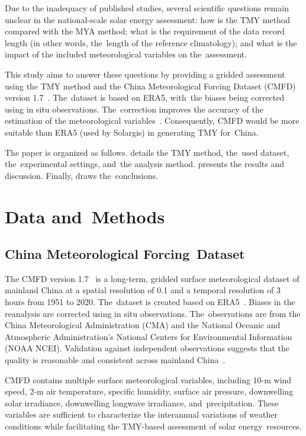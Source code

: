 \documentclass[atmosphere,article,accept,pdftex,moreauthors]{Definitions/mdpi}
\begin{document}
Due to the inadequacy of published studies, several scientific questions remain unclear in the national-scale solar energy assessment: how is the TMY method compared with the MYA method; what is the requirement of the data record length (in other words, the~length of the reference climatology); and what is the impact of the included meteorological variables on the~assessment.

This study aims to answer these questions by providing a gridded assessment using the TMY method and the China Meteorological Forcing Dataset (CMFD) version 1.7~\cite{he2020SD}. The~dataset is based on ERA5, with~the biases being corrected using in situ observations. The~correction improves the accuracy of the estimation of the meteorological variables~\cite{yang2017HESS, lei2023ESS}. Consequently, CMFD would be more suitable than ERA5 (used by Solargis) in generating TMY for~China.

The paper is organized as follows.  details the TMY method, the~used dataset, the~experimental settings, and~the analysis method.  presents the results and discussion. Finally,  draws the~conclusions.

\section{Data and~Methods}\label{sec:datamethods}
\unskip

\subsection{China Meteorological Forcing~Dataset}\label{sec:datamethods:cmfd}

The CMFD version 1.7~\cite{he2020SD} is a long-term, gridded surface meteorological dataset of mainland China at a spatial resolution of 0.1\textdegree{} and a temporal resolution of 3 hours from 1951 to 2020. The~dataset is created based on ERA5~\cite{hersbach2020QJRMS, bell2021QJRMS}. Biases in the reanalysis are corrected using in situ observations. The~observations are from the China Meteorological Administration (CMA) and the National Oceanic and Atmospheric Administration's National Centers for Environmental Information (NOAA NCEI). Validation against independent observations suggests that the quality is reasonable and consistent across mainland China~\cite{he2020SD, yang2017HESS, lei2023ESS}.

CMFD contains multiple surface meteorological variables, including 10-m wind speed, 2-m air temperature, specific humidity, surface air pressure, downwelling solar irradiance, downwelling longwave irradiance, and~precipitation. These variables are sufficient to characterize the interannual variations of weather conditions while facilitating the TMY-based assessment of solar energy~resources.
\end{document}
